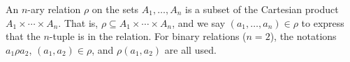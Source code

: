 An $n$-ary relation $\rho$ on the sets $A_1, \ldots, A_n$ is a subset of the Cartesian product $A_1 \times \cdots \times A_n$. That is, $\rho \subseteq A_1 \times \cdots \times A_n$, and we say $(a_1, \ldots, a_n) \in \rho$ to express that the $n$-tuple is in the relation. For binary relations ($n=2$), the notations $a_1 \rho a_2$, $(a_1, a_2) \in \rho$, and $\rho(a_1, a_2)$ are all used.
